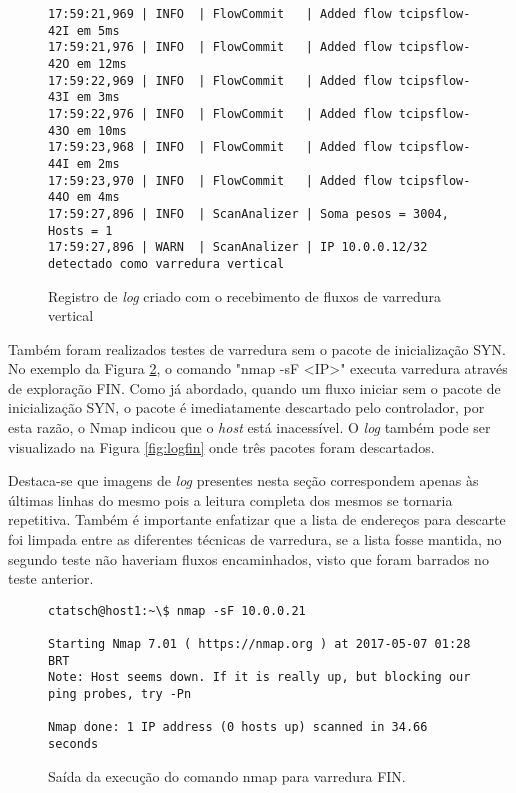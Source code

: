 \FloatBarrier
\begin{figure}[H]
\centering
\caption{Registro de \textit{log} criado com o recebimento de fluxos de varredura vertical}
\begin{lstlisting}[belowskip=-0.05\baselineskip]
17:59:21,969 | INFO  | FlowCommit   | Added flow tcipsflow-42I em 5ms
17:59:21,976 | INFO  | FlowCommit   | Added flow tcipsflow-42O em 12ms
17:59:22,969 | INFO  | FlowCommit   | Added flow tcipsflow-43I em 3ms
17:59:22,976 | INFO  | FlowCommit   | Added flow tcipsflow-43O em 10ms
17:59:23,968 | INFO  | FlowCommit   | Added flow tcipsflow-44I em 2ms
17:59:23,970 | INFO  | FlowCommit   | Added flow tcipsflow-44O em 4ms
17:59:27,896 | INFO  | ScanAnalizer | Soma pesos = 3004, Hosts = 1
17:59:27,896 | WARN  | ScanAnalizer | IP 10.0.0.12/32 detectado como varredura vertical
\end{lstlisting}
\label{fig:logver}
\end{figure}

Também foram realizados testes de varredura sem o pacote de inicialização SYN. No exemplo da Figura \ref{fig:outnmapsf}, o comando "nmap -sF <IP>" executa varredura através de exploração FIN. Como já abordado, quando um fluxo iniciar sem o pacote de inicialização SYN, o pacote é imediatamente descartado pelo controlador, por esta razão, o Nmap indicou que o \textit{host} está inacessível. O \textit{log} também pode ser visualizado na Figura \ref{fig:logfin} onde três pacotes foram descartados.

Destaca-se que imagens de \textit{log} presentes nesta seção correspondem apenas às últimas linhas do mesmo pois a leitura completa dos mesmos se tornaria repetitiva. Também é importante enfatizar que a lista de endereços para descarte foi limpada entre as diferentes técnicas de varredura, se a lista fosse mantida, no segundo teste não haveriam fluxos encaminhados, visto que foram barrados no teste anterior.

\FloatBarrier
\begin{figure}[H]
\centering
\caption{Saída da execução do comando nmap para varredura FIN.}
\begin{lstlisting}[belowskip=-0.05\baselineskip]
ctatsch@host1:~\$ nmap -sF 10.0.0.21

Starting Nmap 7.01 ( https://nmap.org ) at 2017-05-07 01:28 BRT
Note: Host seems down. If it is really up, but blocking our ping probes, try -Pn

Nmap done: 1 IP address (0 hosts up) scanned in 34.66 seconds
\end{lstlisting}
\label{fig:outnmapsf}
\end{figure}


